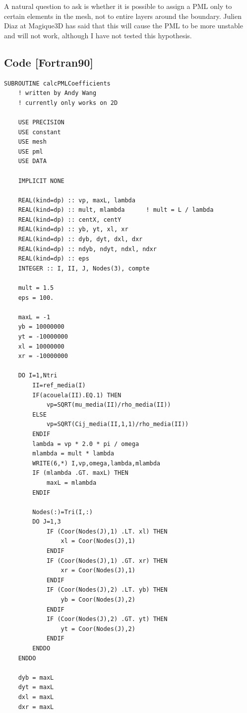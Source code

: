 A natural question to ask is whether it is possible to assign a PML only to certain elements in the mesh, not to entire layers around the boundary. Julien Diaz at Magique3D has said that this will cause the PML to be more unstable and will not work, although I have not tested this hypothesis.


\newpage

\subsection{Code [Fortran90]}
\lstset{basicstyle=\small, style=fortranStyle}
\begin{lstlisting}
SUBROUTINE calcPMLCoefficients
    ! written by Andy Wang
    ! currently only works on 2D

    USE PRECISION
    USE constant
    USE mesh
    USE pml
    USE DATA

    IMPLICIT NONE
	
    REAL(kind=dp) :: vp, maxL, lambda
    REAL(kind=dp) :: mult, mlambda      ! mult = L / lambda
    REAL(kind=dp) :: centX, centY
    REAL(kind=dp) :: yb, yt, xl, xr
    REAL(kind=dp) :: dyb, dyt, dxl, dxr
    REAL(kind=dp) :: ndyb, ndyt, ndxl, ndxr
    REAL(kind=dp) :: eps
    INTEGER :: I, II, J, Nodes(3), compte

    mult = 1.5
    eps = 100.

    maxL = -1
    yb = 10000000
    yt = -10000000
    xl = 10000000
    xr = -10000000

    DO I=1,Ntri
        II=ref_media(I)
        IF(acouela(II).EQ.1) THEN
            vp=SQRT(mu_media(II)/rho_media(II))
        ELSE
            vp=SQRT(Cij_media(II,1,1)/rho_media(II))
        ENDIF
        lambda = vp * 2.0 * pi / omega
        mlambda = mult * lambda
        WRITE(6,*) I,vp,omega,lambda,mlambda
        IF (mlambda .GT. maxL) THEN
            maxL = mlambda
        ENDIF
		
        Nodes(:)=Tri(I,:)
        DO J=1,3
            IF (Coor(Nodes(J),1) .LT. xl) THEN
                xl = Coor(Nodes(J),1)
            ENDIF
            IF (Coor(Nodes(J),1) .GT. xr) THEN
                xr = Coor(Nodes(J),1)
            ENDIF
            IF (Coor(Nodes(J),2) .LT. yb) THEN
                yb = Coor(Nodes(J),2)
            ENDIF
            IF (Coor(Nodes(J),2) .GT. yt) THEN
                yt = Coor(Nodes(J),2)
            ENDIF
        ENDDO
    ENDDO

    dyb = maxL
    dyt = maxL
    dxl = maxL
    dxr = maxL


\end{lstlisting}
